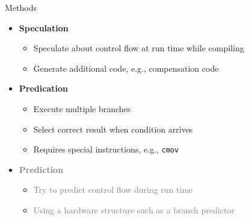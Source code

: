 \documentclass[presentation]{beamer}
\begin{document}
\begin{frame}{Methods}
\begin{center}

\end{center}
\begin{itemize}
    \item \textbf{Speculation}
        \begin{itemize}
            \item Speculate about control flow at run time while compiling
            \item Generate additional code, e.g., compensation code 
        \end{itemize}
    \item \textbf{Predication}
        \begin{itemize}
            \item Execute multiple branches
            \item Select correct result when condition arrives
            \item Requires special instructions, e.g., \texttt{cmov}
        \end{itemize}
    \item \textcolor{gray}{\textbf{Prediction}} 
        \begin{itemize}
            \item \textcolor{gray}{Try to predict control flow during run time}
            \item \textcolor{gray}{Using a hardware structure such as a branch predictor}
        \end{itemize}
\end{itemize}

\end{frame}
\end{document}
